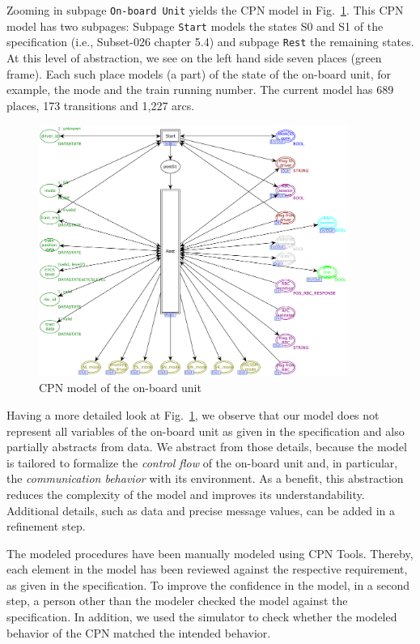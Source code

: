 Zooming in subpage \texttt{On-board Unit} yields the CPN model in Fig.~\ref{fig:OBUnit}. This CPN model has two subpages: Subpage \texttt{Start} models the states S0 and S1 of the specification (i.e., Subset-026 chapter 5.4) and subpage \texttt{Rest} the remaining states. At this level of abstraction, we see on the left hand side seven places (green frame). Each such place models (a part) of the state of the on-board unit, for example, the mode and the train running number. The current model has 689 places, 173 transitions and 1,227 arcs.

\begin{figure}[tb]
	\centering
		\includegraphics[width=0.9\textwidth]{figures/OBUnit.pdf}
	\caption{CPN model of the on-board unit}
	\label{fig:OBUnit}
\end{figure}

Having a more detailed look at Fig.~\ref{fig:OBUnit}, we observe that our model does not represent all variables of the on-board unit as given in the specification and also partially abstracts from data. We abstract from those details, because the model is tailored to formalize the \textit{control flow} of the on-board unit and, in particular, the \textit{communication behavior} with its environment. As a benefit, this abstraction reduces the complexity of the model and improves its understandability. Additional details, such as data and precise message values, can be added in a refinement step.

The modeled procedures have been manually modeled using CPN Tools. Thereby, each element in the model has been reviewed against the respective requirement, as given in the specification. To improve the confidence in the model, in a second step, a person other than the modeler checked the model against the specification. In addition, we used the simulator to check whether the modeled behavior of the CPN matched the intended behavior.

